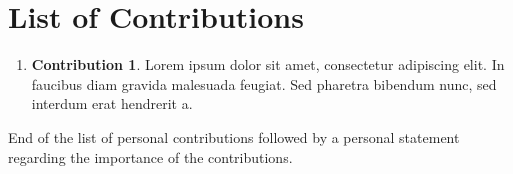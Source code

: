 

\chapter*{List of Contributions} %
\label{chap:Articles}

\begin{enumerate}
	\item \textbf{Contribution 1}. Lorem ipsum dolor sit amet, consectetur adipiscing elit. In faucibus diam gravida malesuada feugiat. Sed pharetra bibendum nunc, sed interdum erat hendrerit a.
\end{enumerate}

\noindent End of the list of personal contributions followed by a personal statement regarding the importance of the contributions.

\cleardoublepage